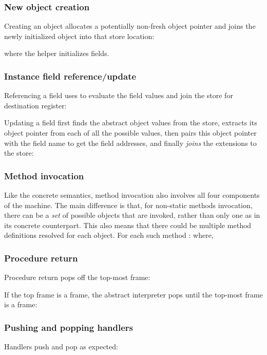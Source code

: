 \subsubsection{\textbf{New object creation}} 
Creating an object allocates a potentially non-fresh object pointer
and joins the newly initialized object into that store location:

where the  helper 
 initializes fields. 
  
  \subsubsection{\textbf{Instance field reference/update}}
Referencing a field uses  to evaluate the field values and join the store for destination register:
 
   Updating a field first finds the abstract object values from the
   store, extracts its object pointer from each of all the
   possible values, then pairs this object pointer with the field name
   to get the field addresses, and finally \textit{joins} the extensions
   to the store:
 
   


\subsubsection{\textbf{Method invocation}}
Like the concrete semantics, method invocation also involves all four components of the machine.
The main difference is that, for non-static methods invocation, there can be a \emph{set} of possible objects that are invoked, 
rather than only one as in its concrete counterpart. 
This also means that there could be multiple method definitions resolved for each object.
For each such method : 
where,




\subsubsection{\textbf{Procedure return}}
Procedure return pops off the top-most  frame:

If the top frame is a  frame, 
the abstract interpreter pops until the top-most frame is 
a  frame:
 
  
  
  \subsubsection{\textbf{Pushing and popping handlers}}
  Handlers push and pop as expected:
   
